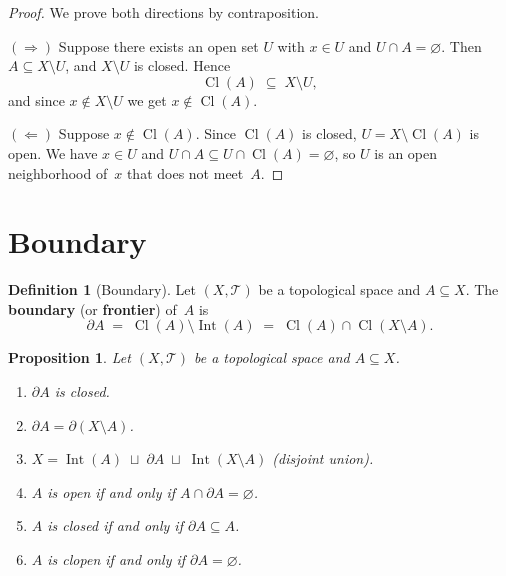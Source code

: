 \documentclass[11pt,a4paper,twoside]{book}
\newtheorem{proposition}[theorem]{Proposition}
\theoremstyle{remark}
\theoremstyle{definition}
\theoremstyle{definition}
\newtheorem{definition}{Definition}[section]
\newcommand{\Tau}{\mathcal{T}}           %
\newcommand{\boundary}{\partial}         %
\DeclareMathOperator{\Int}{Int}
\DeclareMathOperator{\Cl}{Cl}
\begin{document}
\begin{proof}
We prove both directions by contraposition.

$(\Rightarrow)$ Suppose there exists an open set $U$ with $x\in U$ and
$U\cap A=\varnothing$.  Then $A\subseteq X\setminus U$, and $X\setminus U$ is
closed.  Hence
\[
  \Cl(A) \;\subseteq\; X\setminus U,
\]
and since $x\notin X\setminus U$ we get $x\notin\Cl(A)$.

$(\Leftarrow)$ Suppose $x\notin\Cl(A)$.  Since $\Cl(A)$ is closed,
$U=X\setminus\Cl(A)$ is open.  We have $x\in U$ and
$U\cap A\subseteq U\cap\Cl(A)=\varnothing$, so $U$ is an open neighborhood
of~$x$ that does not meet~$A$.
\end{proof}


\section{Boundary}
\label{sec:boundary}

\begin{definition}[Boundary]\label{def:boundary}
Let $(X,\Tau)$ be a topological space and $A\subseteq X$.  The
\textbf{boundary} (or \textbf{frontier}) of~$A$ is
\[
  \boundary A \;=\; \Cl(A)\setminus\Int(A) \;=\; \Cl(A)\cap\Cl(X\setminus A).
\]
\end{definition}

\begin{proposition}\label{prop:boundary-properties}
Let $(X,\Tau)$ be a topological space and $A\subseteq X$.
\begin{enumerate}[label=\textup{(\roman*)}]
  \item $\boundary A$ is closed.
  \item $\boundary A = \boundary(X\setminus A)$.
  \item $X = \Int(A)\;\sqcup\;\boundary A\;\sqcup\;\Int(X\setminus A)$
        (disjoint union).
  \item $A$ is open if and only if $A\cap\boundary A=\varnothing$.
  \item $A$ is closed if and only if $\boundary A\subseteq A$.
  \item $A$ is clopen if and only if $\boundary A=\varnothing$.
\end{enumerate}
\end{proposition}
\end{document}
